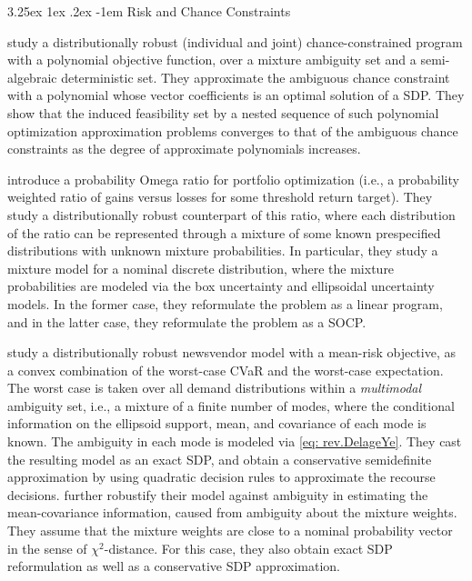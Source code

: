 \documentclass[final,onefignum,onetabnum]{class}
\makeatletter
\renewcommand\paragraph{\@startsection{paragraph}{4}{\z@}%
  {3.25ex \@plus1ex \@minus.2ex}%
  {-1em}%
  {\normalfont\normalsize\bfseries}}
\newcommand{\dro}{DRO}
\makeatother
\begin{document}
\paragraph{Risk and Chance Constraints}

\citet{lasserre2018representation} study a distributionally robust (individual and joint) chance-constrained program with  a polynomial objective function, over a mixture ambiguity set and a semi-algebraic deterministic set. They approximate  the ambiguous chance constraint with a polynomial whose vector coefficients is an optimal solution of a SDP. They show that the induced feasibility set by a nested sequence of such   polynomial optimization approximation problems converges to that of  the  ambiguous  chance constraints as the degree of approximate polynomials increases.     


\citet{kapsos2014} introduce a probability Omega ratio  for portfolio optimization (i.e., a probability weighted ratio of gains versus losses for some threshold return target). They study a distributionally robust counterpart of this ratio, where each distribution of the ratio can be represented through   a mixture of some known prespecified distributions with unknown mixture probabilities. In particular, they study a mixture model for a nominal discrete distribution, where the mixture probabilities are modeled via the box uncertainty and ellipsoidal uncertainty models. In the former case, they reformulate the problem as a linear program, and in the latter case, they reformulate the problem as a SOCP. 


\citet{hanasusanto2015NV} study a distributionally robust newsvendor model with a mean-risk objective, as a convex combination of the worst-case CVaR and the worst-case expectation. The worst case is taken over all demand distributions
within a {\it multimodal} ambiguity set, i.e., a mixture of a finite number of modes, where the conditional information on the ellipsoid support, mean, and covariance of each mode is known.  The ambiguity in each mode is modeled via \eqref{eq: rev.DelageYe}. They cast the resulting model as  an exact SDP, and obtain a conservative semidefinite approximation by using quadratic decision rules to approximate the recourse decisions. \citet{hanasusanto2015NV} further robustify their model against ambiguity in estimating the mean-covariance information, caused from ambiguity about the mixture weights. They assume that the mixture weights are close  to a  nominal  probability vector in the sense of $\chi^2$-distance. For this case, they also obtain exact SDP reformulation as well as a conservative SDP approximation. %
\end{document}

